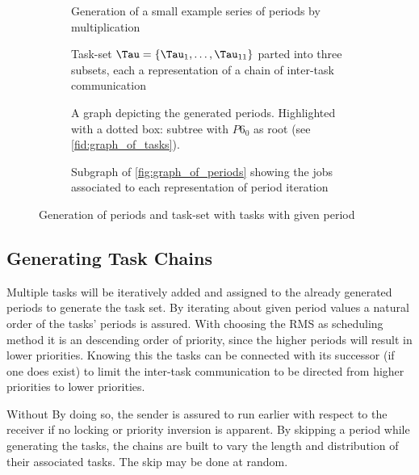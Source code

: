 \begin{figure}[ht]
  \begin{subfigure}[c]{0.45\textwidth}
    \resizebox{\textwidth}{!}{%
      \label{fig:chain_of_periods}
    
 }
    \caption{Generation of a small example series of periods by multiplication}
  \end{subfigure}
  \hfill
  \begin{subfigure}[c]{0.45\textwidth}
    \resizebox{\textwidth}{!}{%
      \label{fig:chain_of_tasks}
      
 }
    \caption{Task-set $\Tau=\{\Tau_{1}, \ldots, \Tau_{11}\}$ parted into three subsets, each a representation of a chain of inter-task communication}
  \end{subfigure}
  \begin{subfigure}[c]{0.450\textwidth}
    \resizebox{\textwidth}{!}{%
      \label{fig:graph_of_periods}
      
 }
    \caption{A graph depicting the generated periods. Highlighted with a dotted box: subtree with $P6_0$ as root (see \cref{fid:graph_of_tasks}).}
  \end{subfigure}
  \hfill
  \begin{subfigure}[c]{0.45\textwidth}
    \resizebox{\textwidth}{!}{%
      \label{fig:graph_of_tasks}
      
 }
    \caption{Subgraph of \cref{fig:graph_of_periods} showing the jobs associated to each representation of period iteration}
  \end{subfigure}
  \caption{Generation of periods and task-set with tasks with given period}\label{fig:graph}
\end{figure}

\subsection{Generating Task Chains}\label{sec:concept_task_chains}
Multiple tasks will be iteratively added and assigned to the already generated periods to generate the task set.
By iterating about given period values a natural order of the tasks' periods is assured.
With choosing the \ac{RMS} as scheduling method it is an descending order of priority, since the higher periods will result in lower priorities.
Knowing this the tasks can be connected with its successor (if one does exist) to limit the inter-task communication to be directed from higher priorities to lower priorities.

Without \todo{!} 
By doing so, the sender is assured to run earlier with respect to the receiver if no locking or priority inversion is apparent. 
By skipping a period while generating the tasks, the chains are built to vary the length and distribution of their associated tasks.
The skip may be done at random.

